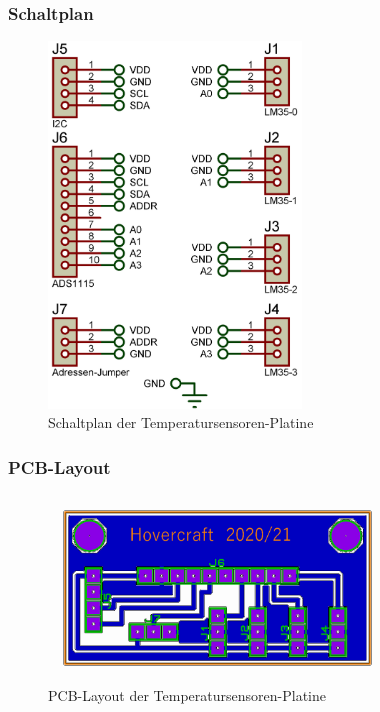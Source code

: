 \subsubsection{Schaltplan}
\begin{figure}[h]
    \centering
    \includegraphics[width=0.6\textwidth]{../Proteus/Exports/Temperatursensoren-Platine.png}    
    \caption{Schaltplan der Temperatursensoren-Platine\label{fig:plat:temp}}
\end{figure}

\newpage

\subsubsection{PCB-Layout}
\begin{figure}[h]
    \centering
    \includegraphics[width=0.8\textwidth]{../Proteus/Exports/Temperatursensoren-Platine-PCB.png}    
    \caption{PCB-Layout der Temperatursensoren-Platine}
\end{figure}

